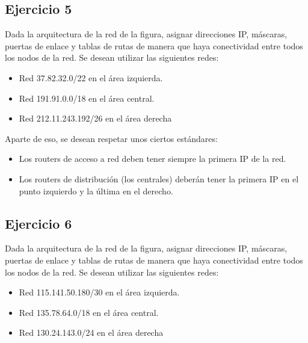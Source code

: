 \documentclass[letterpaper,10pt,spanish]{sphinxmanual}
\begin{document}
\subsection{Ejercicio 5}
\label{\detokenize{t2_integracion_elementos/ejercicios_subredes_ipv4/ejercicios_dos_router:ejercicio-5}}
\sphinxAtStartPar
Dada la arquitectura de la red de la figura, asignar direcciones IP, máscaras, puertas de enlace y tablas de rutas de manera que haya conectividad entre todos
los nodos de la red. Se desean utilizar las siguientes redes:
\begin{itemize}
\item {} 
\sphinxAtStartPar
Red 37.82.32.0/22 en el área izquierda.

\item {} 
\sphinxAtStartPar
Red 191.91.0.0/18 en el área central.

\item {} 
\sphinxAtStartPar
Red 212.11.243.192/26 en el área derecha

\end{itemize}

\begin{figure}[htbp]
\centering

\noindent{}
\end{figure}

\sphinxAtStartPar
Aparte de eso, se desean respetar unos ciertos estándares:
\begin{itemize}
\item {} 
\sphinxAtStartPar
Los routers de acceso a red deben tener siempre la primera IP de la red.

\item {} 
\sphinxAtStartPar
Los routers de distribución (los centrales) deberán tener la primera IP en el punto izquierdo y la última en el derecho.

\end{itemize}


\subsection{Ejercicio 6}
\label{\detokenize{t2_integracion_elementos/ejercicios_subredes_ipv4/ejercicios_dos_router:ejercicio-6}}
\sphinxAtStartPar
Dada la arquitectura de la red de la figura, asignar direcciones IP, máscaras, puertas de enlace y tablas de rutas de manera que haya conectividad entre todos
los nodos de la red. Se desean utilizar las siguientes redes:
\begin{itemize}
\item {} 
\sphinxAtStartPar
Red 115.141.50.180/30 en el área izquierda.

\item {} 
\sphinxAtStartPar
Red 135.78.64.0/18 en el área central.

\item {} 
\sphinxAtStartPar
Red 130.24.143.0/24 en el área derecha

\end{itemize}
\end{document}
